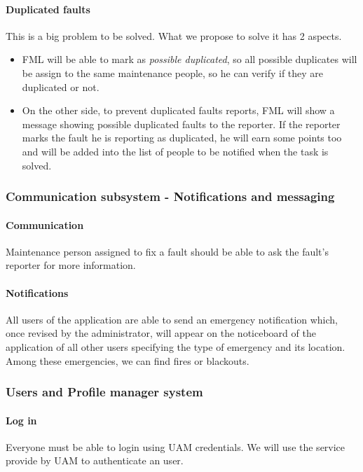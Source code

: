 \paragraph{Duplicated faults} This is a big problem to be solved. What we propose to solve it has 2 aspects.
\begin{itemize}
\item FML will be able to mark as \textit{possible duplicated}, so all possible duplicates will be assign to the same maintenance people, so he can verify if they are duplicated or not.

\item On the other side, to prevent duplicated faults reports, FML will show a message showing possible duplicated faults to the reporter. If the reporter marks the fault he is reporting as duplicated, he will earn some points too and will be added into the list of people to be notified when the task is solved.
\end{itemize}


\subsubsection{Communication subsystem - Notifications and messaging}

\paragraph{Communication} Maintenance person assigned to fix a fault should be able to ask the fault's reporter for more information.

\paragraph{Notifications} All users of the application are able to send an emergency notification which, once revised by the administrator, will appear on the noticeboard of the application of all other users specifying the type of emergency and its location. Among these emergencies, we can find fires or blackouts.

\subsubsection{Users and Profile manager system}

\paragraph{Log in} Everyone must be able to login using UAM credentials. We will use the service provide by UAM to authenticate an user.

